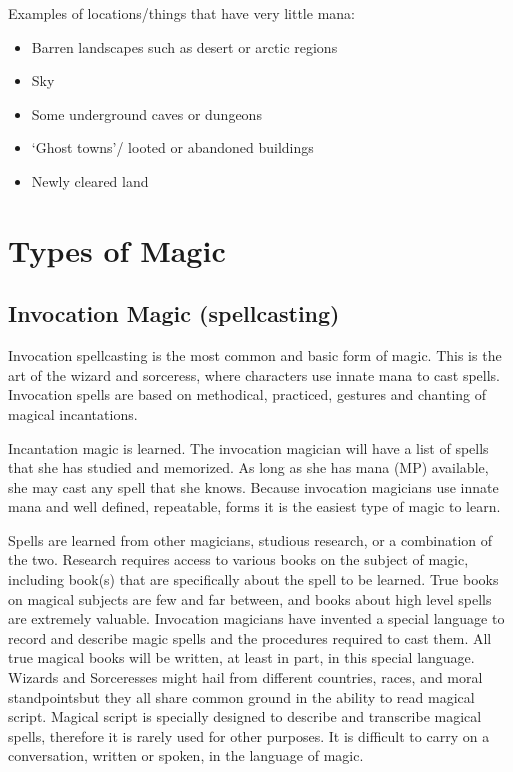 \documentclass[twoside]{book}
\begin{document}
    {  
    Examples of locations/things that have very little mana:
    }
  
\begin{itemize}
      
  \item Barren landscapes such as desert or arctic regions
  \item Sky
  \item Some underground caves or dungeons
  \item `Ghost towns'/ looted or abandoned buildings
  \item Newly cleared land
\end{itemize}
  
    

\section{Types of Magic}
    
    

\subsection{Invocation Magic (spellcasting)}
    
    {  
    Invocation spellcasting is the most common and basic form of magic. This is the art of the wizard and sorceress, where characters use innate mana to cast spells. Invocation spells are based on methodical, practiced, gestures and chanting of magical incantations.
    }
  
    {  
    Incantation magic is learned. The invocation magician will have a list of spells that she has studied and memorized. As long as she has mana (MP) available, she may cast any spell that she knows. Because invocation magicians use innate mana and well defined, repeatable, forms it is the easiest type of magic to learn.
    }
  
    {  
    Spells are learned from other magicians, studious research, or a combination of the two. Research requires access to various books on the subject of magic, including book(s) that are specifically about the spell to be learned. True books on magical subjects are few and far between, and books about high level spells are extremely valuable. Invocation magicians have invented a special language to record and describe magic spells and the procedures required to cast them. All true magical books will be written, at least in part, in this special language. Wizards and Sorceresses might hail from different countries, races, and moral standpointsbut they all share common ground in the ability to read magical script. Magical script is specially designed to describe and transcribe magical spells, therefore it is rarely used for other purposes. It is difficult to carry on a conversation, written or spoken, in the language of magic.
    }
  
\end{document}
